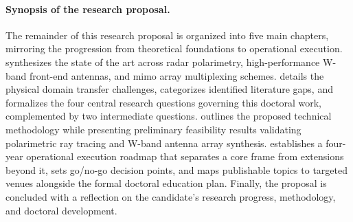\paragraph{Synopsis of the research proposal.}
The remainder of this research proposal is organized into five main chapters, mirroring the progression from theoretical foundations to operational execution.
\textbf{} synthesizes the state of the art across radar polarimetry, high-performance W-band front-end antennas, and \gls{mimo} array multiplexing schemes.
\textbf{} details the physical domain transfer challenges, categorizes identified literature gaps, and formalizes the four central research questions governing this doctoral work, complemented by two intermediate questions.
\textbf{} outlines the proposed technical methodology while presenting preliminary feasibility results validating polarimetric ray tracing and W-band antenna array synthesis.
\textbf{} establishes a four-year operational execution roadmap that separates a core frame from extensions beyond it, sets go/no-go decision points, and maps publishable topics to targeted venues alongside the formal doctoral education plan.
Finally, the proposal is concluded with a reflection on the candidate's research progress, methodology, and doctoral development.


